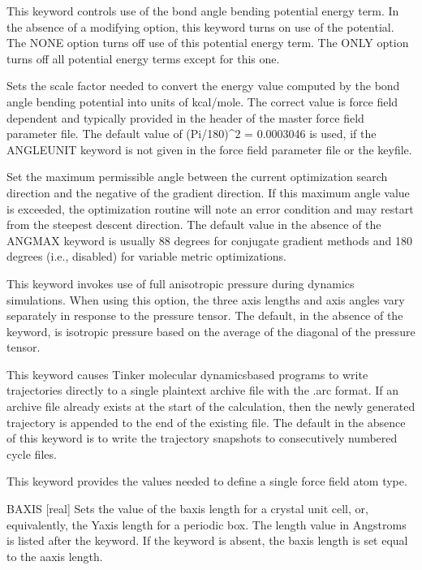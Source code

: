 \documentclass[letterpaper,11pt,english]{sphinxmanual}
\begin{document}
  This keyword controls use of the bond angle bending potential energy term. In the absence of a modifying option, this keyword turns on use of the potential. The NONE option turns off use of this potential energy term. The ONLY option turns off all potential energy terms except for this one.

  Sets the scale factor needed to convert the energy value computed by the bond angle bending potential into units of kcal/mole. The correct value is force field dependent and typically provided in the header of the master force field parameter file. The default value of (Pi/180)\textasciicircum{}2 = 0.0003046 is used, if the ANGLEUNIT keyword is not given in the force field parameter file or the keyfile.

  Set the maximum permissible angle between the current optimization search direction and the negative of the gradient direction. If this maximum angle value is exceeded, the optimization routine will note an error condition and may restart from the steepest descent direction. The default value in the absence of the ANGMAX keyword is usually 88 degrees for conjugate gradient methods and 180 degrees (i.e., disabled) for variable metric optimizations.

  This keyword invokes use of full anisotropic pressure during dynamics simulations. When using this option, the three axis lengths and axis angles vary separately in response to the pressure tensor. The default, in the absence of the keyword, is isotropic pressure based on the average of the diagonal of the pressure tensor.

  This keyword causes Tinker molecular dynamics\sphinxhyphen{}based programs to write trajectories directly to a single plain\sphinxhyphen{}text archive file with the .arc format. If an archive file already exists at the start of the calculation, then the newly generated trajectory is appended to the end of the existing file. The default in the absence of this keyword is to write the trajectory snapshots to consecutively numbered cycle files.

  This keyword provides the values needed to define a single force field atom type.

B\sphinxhyphen{}AXIS {[}real{]}     Sets the value of the b\sphinxhyphen{}axis length for a crystal unit cell, or, equivalently,  the Y\sphinxhyphen{}axis length for a periodic box. The length value in Angstroms is listed after the keyword. If the keyword is absent, the b\sphinxhyphen{}axis length is set equal to the a\sphinxhyphen{}axis length.
\end{document}
